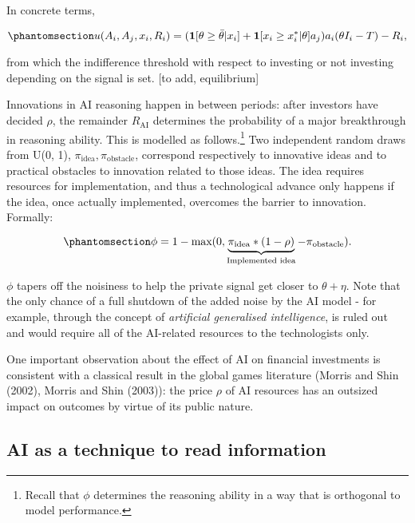 \documentclass[
]{article}
\theoremstyle{plain}
\theoremstyle{remark}
\begin{document}
In concrete terms,

\begin{equation}\phantomsection\label{eq-utility}{
u(A_i, A_j, x_i, R_i) = (\mathbf{1}[\theta \geq \bar{\theta}|x_i] + \mathbf{1}[x_i \geq x_i^*|\theta]a_j)a_i(\theta I_i - T) - R_i,
}\end{equation}

from which the indifference threshold with respect to investing or not
investing depending on the signal is set. {[}to add, equilibrium{]}

Innovations in AI reasoning happen in between periods: after investors
have decided \(\rho\), the remainder \(R_{\text{AI}}\) determines the
probability of a major breakthrough in reasoning ability. This is
modelled as follows.\footnote{Recall that \(\phi\) determines the
  reasoning ability in a way that is orthogonal to model performance.}
Two independent random draws from U(0, 1),
\(\pi_{\text{idea}}, \pi_{\text{obstacle}}\), correspond respectively to
innovative ideas and to practical obstacles to innovation related to
those ideas. The idea requires resources for implementation, and thus a
technological advance only happens if the idea, once actually
implemented, overcomes the barrier to innovation. Formally:

\begin{equation}\phantomsection\label{eq-tech}{
\phi = 1-\text{max}(0, \underbrace{\pi_{\text{idea}} * (1-\rho)}_{\text{Implemented idea}} - \pi_{\text{obstacle}}).
}\end{equation}

\(\phi\) tapers off the noisiness to help the private signal get closer
to \(\theta + \eta\). Note that the only chance of a full shutdown of
the added noise by the AI model - for example, through the concept of
\emph{artificial generalised intelligence}, is ruled out and would
require all of the AI-related resources to the technologists only.

One important observation about the effect of AI on financial
investments is consistent with a classical result in the global games
literature (Morris and Shin (2002), Morris and Shin (2003)): the price
\(\rho\) of AI resources has an outsized impact on outcomes by virtue of
its public nature.

\subsection{AI as a technique to read
information}\label{ai-as-a-technique-to-read-information}
\end{document}
